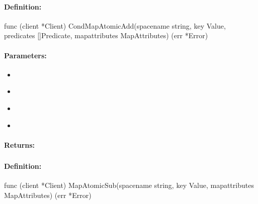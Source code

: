 \paragraph{Definition:}
\begin{gocode}
func (client *Client) CondMapAtomicAdd(spacename string, key Value, predicates []Predicate, mapattributes MapAttributes) (err *Error)
\end{gocode}

\paragraph{Parameters:}
\begin{itemize}[noitemsep]
\item {}\\

\item {}\\

\item {}\\

\item {}\\

\end{itemize}

\paragraph{Returns:}


\pagebreak
\subsubsection{}
\label{api:Go:MapAtomicSub}


\paragraph{Definition:}
\begin{gocode}
func (client *Client) MapAtomicSub(spacename string, key Value, mapattributes MapAttributes) (err *Error)
\end{gocode}


